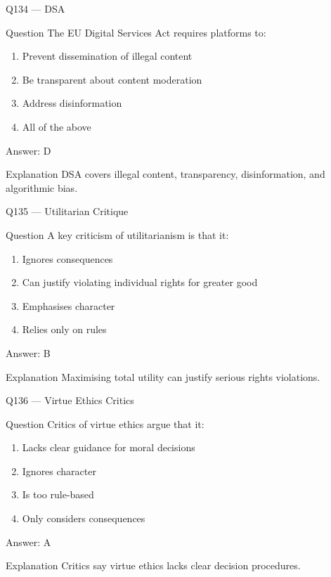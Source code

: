 \documentclass[aspectratio=169,8pt]{beamer}
\begin{document}
	\begin{frame}{Q134 --- DSA}
		\begin{block}{Question}
			The EU Digital Services Act requires platforms to:
		\end{block}
		\begin{enumerate}
			\item Prevent dissemination of illegal content
			\item Be transparent about content moderation
			\item Address disinformation
			\item All of the above
		\end{enumerate}
		\begin{exampleblock}{Answer: D}\end{exampleblock}
		\begin{block}{Explanation}
			DSA covers illegal content, transparency, disinformation, and algorithmic bias.
		\end{block}
	\end{frame}
	
	\begin{frame}{Q135 --- Utilitarian Critique}
		\begin{block}{Question}
			A key criticism of utilitarianism is that it:
		\end{block}
		\begin{enumerate}
			\item Ignores consequences
			\item Can justify violating individual rights for greater good
			\item Emphasises character
			\item Relies only on rules
		\end{enumerate}
		\begin{exampleblock}{Answer: B}\end{exampleblock}
		\begin{block}{Explanation}
			Maximising total utility can justify serious rights violations.
		\end{block}
	\end{frame}
	
	\begin{frame}{Q136 --- Virtue Ethics Critics}
		\begin{block}{Question}
			Critics of virtue ethics argue that it:
		\end{block}
		\begin{enumerate}
			\item Lacks clear guidance for moral decisions
			\item Ignores character
			\item Is too rule-based
			\item Only considers consequences
		\end{enumerate}
		\begin{exampleblock}{Answer: A}\end{exampleblock}
		\begin{block}{Explanation}
			Critics say virtue ethics lacks clear decision procedures.
		\end{block}
	\end{frame}
	
\end{document}
